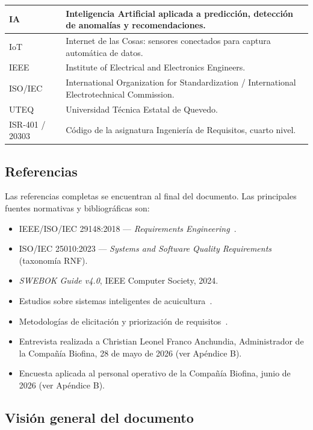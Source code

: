 \documentclass[11pt,a4paper]{article}
\begin{document}
\begin{longtable}{|p{4cm}|p{11cm}|}
IA & Inteligencia Artificial aplicada a predicción, detección de anomalías y recomendaciones. \\
\hline
IoT & Internet de las Cosas: sensores conectados para captura automática de datos. \\
\hline
IEEE & Institute of Electrical and Electronics Engineers. \\
\hline
ISO/IEC & International Organization for Standardization / International Electrotechnical Commission. \\
\hline
UTEQ & Universidad Técnica Estatal de Quevedo. \\
\hline
ISR-401 / 20303 & Código de la asignatura Ingeniería de Requisitos, cuarto nivel. \\
\hline
\end{longtable}

\subsection{Referencias}

Las referencias completas se encuentran al final del documento. Las principales fuentes normativas y bibliográficas son:

\begin{itemize}
    \item IEEE/ISO/IEC 29148:2018 --- \textit{Requirements Engineering}~\cite{ieee29148_2018}.
    \item ISO/IEC 25010:2023 --- \textit{Systems and Software Quality Requirements} (taxonomía RNF).
    \item \textit{SWEBOK Guide v4.0}, IEEE Computer Society, 2024.
    \item Estudios sobre sistemas inteligentes de acuicultura~\cite{aquaculture_iot_2022,aquaculture_management_2023,shrimp_monitoring_2021}.
    \item Metodologías de elicitación y priorización de requisitos~\cite{srs_ieee29148_2022,stakeholder_elicitation_2021,moscow_prioritization_2023}.
    \item Entrevista realizada a Christian Leonel Franco Anchundia, Administrador de la Compañía Biofina, 28 de mayo de 2026 (ver Apéndice B).
    \item Encuesta aplicada al personal operativo de la Compañía Biofina, junio de 2026 (ver Apéndice B).
\end{itemize}

\subsection{Visión general del documento}
\end{document}
